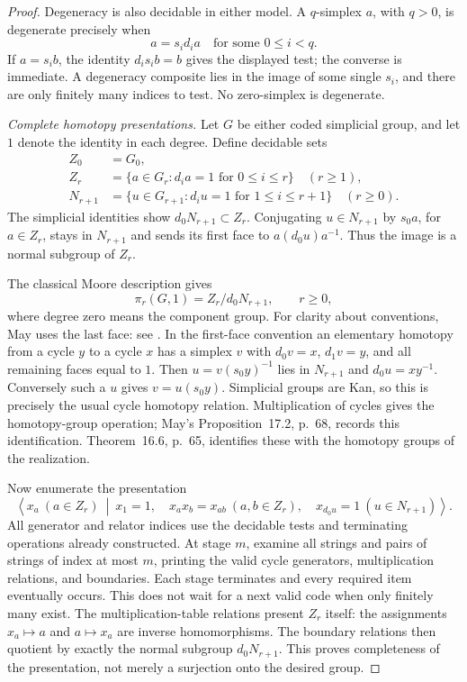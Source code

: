 \begin{proof}
Degeneracy is also decidable in either model.  A $q$-simplex $a$,
with $q>0$, is degenerate precisely when
\[
                   a=s_i d_i a\quad\text{for some }0\leq i<q.
\]
If $a=s_i b$, the identity $d_i s_i b=b$ gives the displayed test;
the converse is immediate.  A degeneracy composite lies in the
image of some single $s_i$, and there are only finitely many indices
to test.  No zero-simplex is degenerate.

\medskip\noindent\textit{Complete homotopy presentations.}
Let $G$ be either coded simplicial group, and let $1$ denote the
identity in each degree.  Define decidable sets
\[
\begin{aligned}
 Z_0&=G_0,\\
 Z_r&=\{a\in G_r:d_i a=1\text{ for }0\leq i\leq r\}
                    \quad(r\geq1),\\
 N_{r+1}&=\{u\in G_{r+1}:d_i u=1\text{ for }1\leq i\leq r+1\}
                    \quad(r\geq0).
\end{aligned}
\]
The simplicial identities show $d_0N_{r+1}\subset Z_r$.
Conjugating $u\in N_{r+1}$ by $s_0a$, for $a\in Z_r$, stays in
$N_{r+1}$ and sends its first face to $a(d_0u)a^{-1}$.
Thus the image is a normal subgroup of $Z_r$.

The classical Moore description gives
\[
                 \pi_r(G,1)=Z_r/d_0N_{r+1},\qquad r\geq0,
\]
where degree zero means the component group.  For clarity about
conventions, May uses the last face: see
\cite[Theorem~17.1, pp.~67--68; both propositions numbered~17.3,
pp.~68--69; Proposition~17.4, p.~69]{May1967Simplicial}.
In the first-face convention an elementary homotopy from a cycle
$y$ to a cycle $x$ has a simplex $v$ with $d_0v=x$, $d_1v=y$,
and all remaining faces equal to $1$.  Then
$u=v(s_0y)^{-1}$ lies in $N_{r+1}$ and $d_0u=xy^{-1}$.
Conversely such a $u$ gives $v=u(s_0y)$.  Simplicial groups are
Kan, so this is precisely the usual cycle homotopy relation.
Multiplication of cycles gives the homotopy-group operation;
May's Proposition~17.2, p.~68, records this identification.
Theorem~16.6, p.~65, identifies these with the homotopy groups
of the realization.

Now enumerate the presentation
\[
 \left\langle x_a\ (a\in Z_r)\ \middle|\
 x_1=1,\quad x_ax_b=x_{ab}\ (a,b\in Z_r),\quad
 x_{d_0u}=1\ (u\in N_{r+1})\right\rangle.
\]
All generator and relator indices use the decidable tests and
terminating operations already constructed. At stage $m$, examine all
strings and pairs of strings of index at most $m$, printing the
valid cycle generators, multiplication relations, and boundaries.
Each stage terminates and every required item eventually occurs.
This does not wait for a next valid code when only finitely many exist.
The multiplication-table relations present $Z_r$ itself: the
assignments $x_a\mapsto a$ and $a\mapsto x_a$ are inverse
homomorphisms.  The boundary relations then quotient by exactly
the normal subgroup $d_0N_{r+1}$.  This proves completeness of the
presentation, not merely a surjection onto the desired group.


\end{proof}
